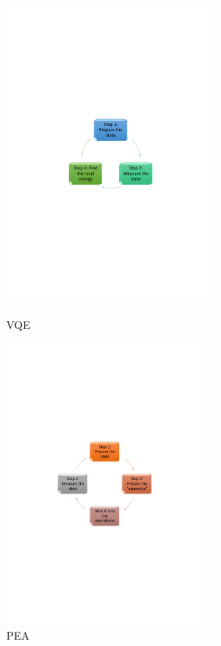 \documentclass[14pt,landscape,color=UCLdarkred,margin=3cm]{uclposter}
\begin{document}
\begin{multicols}{3}
\columnbreak
\bigskip
\begin{figure}[H]
  \begin{center}
 \begin{minipage}[c]{19em}
    \includegraphics[width=19em]{VQEdiagram.pdf}
    \caption{VQE}
  \end{minipage}
  \qquad
  \begin{minipage}[c]{18em}
    \includegraphics[width=18em]{PEA.pdf}
    \caption{PEA}
  \end{minipage}
  \end{center}


\end{figure}
\end{multicols}
\end{document}
